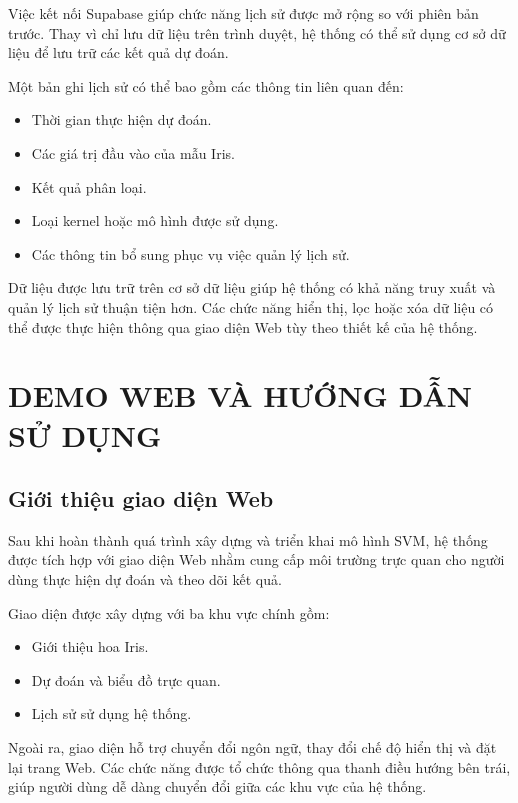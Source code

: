 \documentclass[12pt,a4paper]{report}
\begin{document}
	Việc kết nối Supabase giúp chức năng lịch sử được mở rộng so với phiên bản trước. Thay vì chỉ lưu dữ liệu trên trình duyệt, hệ thống có thể sử dụng cơ sở dữ liệu để lưu trữ các kết quả dự đoán.
	
	Một bản ghi lịch sử có thể bao gồm các thông tin liên quan đến:
	
	\begin{itemize}
		\item Thời gian thực hiện dự đoán.
		\item Các giá trị đầu vào của mẫu Iris.
		\item Kết quả phân loại.
		\item Loại kernel hoặc mô hình được sử dụng.
		\item Các thông tin bổ sung phục vụ việc quản lý lịch sử.
	\end{itemize}
	
	Dữ liệu được lưu trữ trên cơ sở dữ liệu giúp hệ thống có khả năng truy xuất và quản lý lịch sử thuận tiện hơn. Các chức năng hiển thị, lọc hoặc xóa dữ liệu có thể được thực hiện thông qua giao diện Web tùy theo thiết kế của hệ thống.
	

	
	\chapter{DEMO WEB VÀ HƯỚNG DẪN SỬ DỤNG}
	
	\section{Giới thiệu giao diện Web}
	
	Sau khi hoàn thành quá trình xây dựng và triển khai mô hình SVM, hệ thống được tích hợp với giao diện Web nhằm cung cấp môi trường trực quan cho người dùng thực hiện dự đoán và theo dõi kết quả.
	
	Giao diện được xây dựng với ba khu vực chính gồm:
	\begin{itemize}
		\item Giới thiệu hoa Iris.
		\item Dự đoán và biểu đồ trực quan.
		\item Lịch sử sử dụng hệ thống.
	\end{itemize}
	
	Ngoài ra, giao diện hỗ trợ chuyển đổi ngôn ngữ, thay đổi chế độ hiển thị và đặt lại trang Web. Các chức năng được tổ chức thông qua thanh điều hướng bên trái, giúp người dùng dễ dàng chuyển đổi giữa các khu vực của hệ thống. 
	
\end{document}
